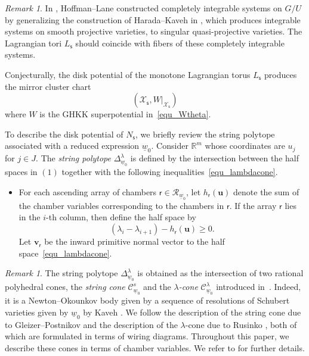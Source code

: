 \documentclass[11pt]{amsart}
\theoremstyle{plain}
\theoremstyle{definition}
\theoremstyle{remark}
\newtheorem{remark}[theorem]{Remark}
\newcommand{\R}{\mathbb{R}}
\numberwithin{equation}{section} \numberwithin{table}{section}
\numberwithin{equation}{section}
\begin{document}
\begin{remark}
In \cite{HL20}, Hoffman--Lane constructed completely integrable systems on $G/U$ by generalizing the construction of Harada--Kaveh in \cite{HK15}, which produces integrable systems on smooth projective varieties, to singular quasi-projective varieties. The Lagrangian tori $L_\mathsf{s}$ should coincide with fibers of these completely integrable systems.
\end{remark}

Conjecturally, the disk potential of the monotone Lagrangian torus $L_\mathsf{s}$ produces the mirror cluster chart 
$$
(\mathcal{X}_\mathsf{s}, W |_{\mathcal{X}_\mathsf{s}})
$$ 
where $W$ is the GHKK superpotential in~\eqref{equ_Wtheta}.


To describe the disk potential of $N_\mathsf{s}$, we briefly review the string polytope associated with a reduced expression $\underline{w}_0$. Consider $\R^m$ whose coordinates are ${u}_j$ for $j \in J$. The \emph{string polytope} $\Delta^\lambda_{\underline{w}_0}$ is defined by the intersection between the half spaces in $(1)$ together with the following inequalities~\eqref{equ_lambdacone}.

\begin{itemize}
\item[(3)] For each ascending array of chambers $\mathsf{r} \in \mathcal{R}_{\underline{w}_0}$, let $h_{\mathsf{r}}({\mathbf{u}})$ denote the sum of the chamber variables corresponding to the chambers in $\mathsf{r}$. If the array $\mathsf{r}$ lies in the $i$-th column, then define the half space by
\begin{equation}\label{equ_lambdacone}
(\lambda_i - \lambda_{i+1}) - h_{\mathsf{r}}({\mathbf{u}}) \geq 0.
\end{equation}
Let $\mathbf{v}_\mathsf{r}$ be the inward primitive normal vector to the half space~\eqref{equ_lambdacone}.
\end{itemize}

\begin{remark}
The string polytope $\Delta_{\underline{w}_0}^\lambda$ is obtained as the intersection of two rational polyhedral cones, the \emph{string cone} $\mathcal{C}_{\underline{w}_0}^s$  and the \emph{$\lambda$-cone} $\mathcal{C}_{\underline{w}_0}^{\lambda}$ introduced in~\cite{Lit98, BZ01}. Indeed, it is a Newton--Okounkov body given by a sequence of resolutions of Schubert varieties given by  ${\underline{w}_0}$ by Kaveh \cite{Kav15}. We follow the description of the string cone due to Gleizer--Postnikov \cite{GP00} and the description of the $\lambda$-cone due to Rusinko \cite{Rus08}, both of which are formulated in terms of wiring diagrams. Throughout this paper, we describe these cones in terms of chamber variables. We refer to \cite[Sections~2 and~4]{CKLP21} for further details.
\end{remark}
\end{document}
